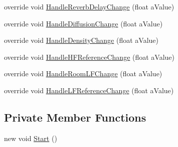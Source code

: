 \begin{DoxyCompactItemize}
\item 
override void \hyperlink{class_a_t_i___reverb_filter_handler_af126757d50b12330f868d2178bdb5d6c}{Handle\+Reverb\+Delay\+Change} (float a\+Value)
\item 
override void \hyperlink{class_a_t_i___reverb_filter_handler_a6cd79af5d1835bd4ab8a6420fed82e53}{Handle\+Diffusion\+Change} (float a\+Value)
\item 
override void \hyperlink{class_a_t_i___reverb_filter_handler_a4a95ee1076720663fbe84e624385e636}{Handle\+Density\+Change} (float a\+Value)
\item 
override void \hyperlink{class_a_t_i___reverb_filter_handler_a4cb8ab454ef637beb189053a0877c8c6}{Handle\+H\+F\+Reference\+Change} (float a\+Value)
\item 
override void \hyperlink{class_a_t_i___reverb_filter_handler_a52fe6f9775f8e51296580f7a96b47bdb}{Handle\+Room\+L\+F\+Change} (float a\+Value)
\item 
override void \hyperlink{class_a_t_i___reverb_filter_handler_abf697e814be89c3bd354deaccb237746}{Handle\+L\+F\+Reference\+Change} (float a\+Value)
\end{DoxyCompactItemize}
\subsection*{Private Member Functions}
\begin{DoxyCompactItemize}
\item 
new void \hyperlink{class_a_t_i___reverb_filter_handler_af9e294ce4222c0e564ea864c14106e7e}{Start} ()
\end{DoxyCompactItemize}
